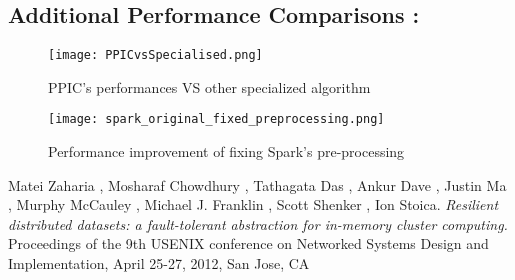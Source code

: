 \documentclass{eplmastersthesis}
\begin{document}
\subsection{Additional Performance Comparisons :}

\begin{figure}[h]
  \centering
  \texttt{[image: PPICvsSpecialised.png]}
  \caption{PPIC's performances VS other specialized algorithm}
  \label{PPIC's perfomance against other specialized implementations}
\end{figure}

\begin{figure}[h]
  \centering
  \texttt{[image: spark\_original\_fixed\_preprocessing.png]}
  \caption{Performance improvement of fixing Spark's pre-processing}
  \label{spark_preprocessing_fix}
\end{figure}

\begin{thebibliography}{9}
Matei Zaharia , Mosharaf Chowdhury , Tathagata Das , Ankur Dave , Justin Ma , Murphy McCauley , Michael J. Franklin , Scott Shenker , Ion Stoica.
\textit{Resilient distributed datasets: a fault-tolerant abstraction for in-memory cluster computing.}
Proceedings of the 9th USENIX conference on Networked Systems Design and Implementation, April 25-27, 2012, San Jose, CA
\end{thebibliography}

\thispagestyle{empty}		
\backcoverpage
\end{document}
